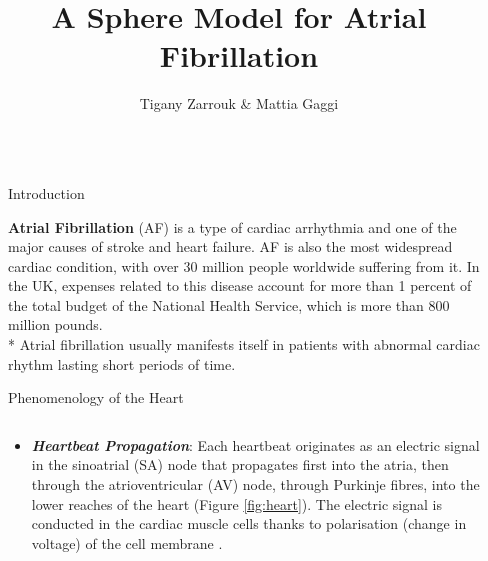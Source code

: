 \documentclass[final,hyperref={pdfpagelabels=false}]{beamer}
\title{\huge A Sphere Model for Atrial Fibrillation} %
\author{Tigany Zarrouk \& Mattia Gaggi } %
\institute{Supervisor: Kim Christensen.  Condensed Matter Theory Group---Imperial College London} %
\begin{document}

\begin{frame}[t] %

\begin{columns}[t] %

\begin{column}{.02\textwidth}\end{column} %

\begin{column}{.465\textwidth} %




            
\begin{block}{Introduction}


\textbf{Atrial Fibrillation} (AF) is a type of cardiac arrhythmia and one of the major causes of stroke and heart failure. AF is also the most widespread cardiac condition, with over 30 million people worldwide suffering from it. In the UK, expenses related to this disease account for more than 1 percent of the total budget of the National Health Service, which is more than 800 million pounds.\\*
 Atrial fibrillation usually manifests itself in patients with abnormal cardiac rhythm lasting short periods of time.\\



\end{block}


\begin{block}{Phenomenology of the Heart}

\begin{columns}
\begin{column}{.54\textwidth}
	\begin{itemize}
	\item \textbf{\textit{Heartbeat Propagation}}: Each heartbeat originates as an electric signal in the sinoatrial (SA) node that propagates first into the atria, then through the atrioventricular (AV) node, through Purkinje fibres, into the lower reaches of the heart (Figure \ref{fig:heart}). The electric signal is conducted in the cardiac muscle cells thanks to polarisation (change in voltage) of the cell membrane \cite{Comtois}. 
	\end{itemize}
\end{column}


\end{columns}
\end{block}
\end{column}
\end{columns}
\end{frame}
\end{document}
